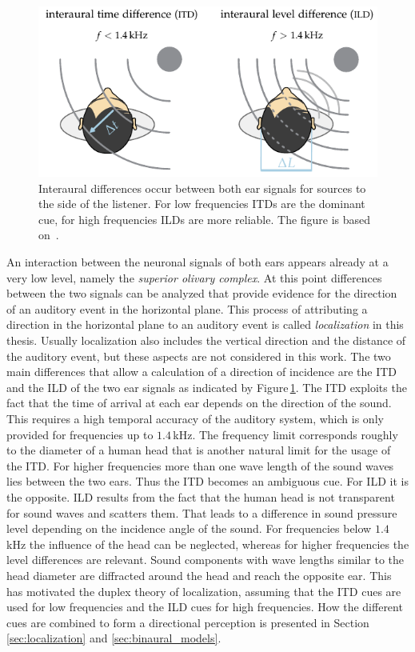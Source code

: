 \begin{figure}[t]
    \centering
    \includegraphics{fig1_02/fig1_02}
    \caption{Interaural differences occur between both ear signals for sources to the
    side of the listener. For low frequencies \acp{ITD} are the dominant cue,
    for high frequencies \acp{ILD} are more reliable.
    The figure is based on~\cite{Grothe2010}.
    }
    \label{fig:itdild}
\end{figure}
%
An interaction between the neuronal signals of both ears appears already
at a very low level, namely the \emph{superior olivary complex}. At this point
differences between the two signals can be analyzed that provide evidence for
the direction of an auditory event in the horizontal plane. This process of
attributing a direction in the horizontal plane to an auditory event is called
\emph{localization} in this thesis. Usually localization also includes
the vertical direction and the distance of the auditory event, but these aspects
are not considered in this work.
The two main differences that allow a calculation of a direction of incidence
are the \acf{ITD} and the \acf{ILD} of the two ear signals as indicated by
Figure\,\ref{fig:itdild}. The \ac{ITD} exploits the fact that the time of arrival
at each ear depends on the direction of the sound. This requires a
high temporal accuracy of the auditory system, which is only provided for
frequencies up to $1.4$\,kHz. The frequency limit corresponds roughly to the
diameter of a human head that is another natural limit for the usage of the \ac{ITD}.
For higher frequencies more than one wave length of the sound waves
lies between the two
ears. Thus the \ac{ITD} becomes an ambiguous cue. For \ac{ILD} it is the opposite.
\ac{ILD} results from the fact that the human head is not transparent for sound
waves and scatters them. That leads to a difference in sound pressure level
depending on the incidence angle of the sound. For frequencies below $1.4$\,kHz
the influence of the head can be neglected, whereas for higher frequencies the level
differences are relevant. Sound components with wave lengths similar to the head diameter are
diffracted around the head and reach the opposite ear.
This has motivated the duplex theory\autocite{Rayleigh1907} of localization,
assuming that the \ac{ITD} cues are used for low frequencies and the
\ac{ILD} cues for high frequencies. How the different cues are combined
to form a directional perception is presented in
Section\,\ref{sec:localization} and \ref{sec:binaural_models}.

